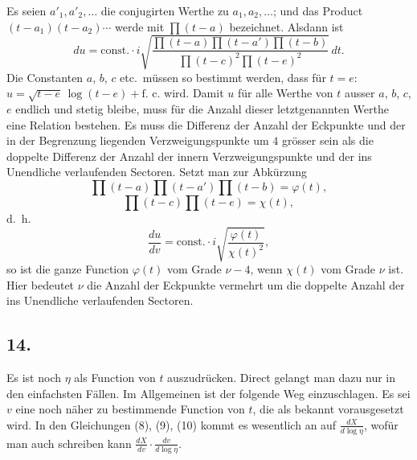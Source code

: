 \documentclass[12pt,a4paper]{article}
\begin{document}
Es seien $a'_{1}, a'_{2}, \dots$ die conjugirten Werthe zu $a_{1}, a_{2}, \dots$; und das Product $(t-a_{1})(t-a_{2})\cdots$ werde mit $\prod(t-a)$ bezeichnet. Alsdann ist
\begin{equation}\tag{11}
du = \text{const.} \cdot i \sqrt{ \frac{ \prod(t-a)\prod(t-a')\prod(t-b) }{ \prod(t-c)^{2}\prod(t-e)^{2}} } \, dt.
\end{equation}
Die Constanten $a$, $b$, $c$ etc.\ m\"ussen so bestimmt werden, dass f\"ur $t=e$: $u = \sqrt{t-e}\, \log(t-e) + \text{f.\ c.}$ wird. Damit $u$ f\"ur alle Werthe von $t$ ausser $a$, $b$, $c$, $e$ endlich und stetig bleibe, muss f\"ur die Anzahl dieser letztgenannten Werthe eine Relation bestehen. Es muss die Differenz der Anzahl der Eckpunkte und der in der Begrenzung liegenden Verzweigungspunkte um $4$ gr\"osser sein als die doppelte Differenz der Anzahl der innern Verzweigungspunkte und der ins Unendliche verlaufenden Sectoren. Setzt man zur Abk\"urzung
\[\prod(t-a)\prod(t-a')\prod(t-b) = \varphi(t),\]
\[\prod(t-c)\prod(t-e) = \chi(t),\]
\newpage
\noindent d.\ h.
\[\frac{du}{dv} = \text{const.} \cdot i \sqrt{\frac{\varphi(t)}{\chi(t)^{2}}},\]
so ist die ganze Function $\varphi(t)$ vom Grade $\nu - 4$, wenn $\chi(t)$ vom Grade $\nu$ ist. Hier bedeutet $\nu$ die Anzahl der Eckpunkte vermehrt um die doppelte Anzahl der ins Unendliche verlaufenden Sectoren.

\subsection*{14.}

Es ist noch $\eta$ als Function von $t$ auszudr\"ucken. Direct gelangt man dazu nur in den einfachsten F\"allen. Im Allgemeinen ist der folgende Weg einzuschlagen. Es sei $v$ eine noch n\"aher zu bestimmende Function von $t$, die als bekannt vorausgesetzt wird. In den Gleichungen (8), (9), (10) kommt es wesentlich an auf $\frac{dX}{d\log\eta}$, wof\"ur man auch schreiben kann $\frac{dX}{dv} \cdot \frac{dv}{d\log\eta}$.
\end{document}
